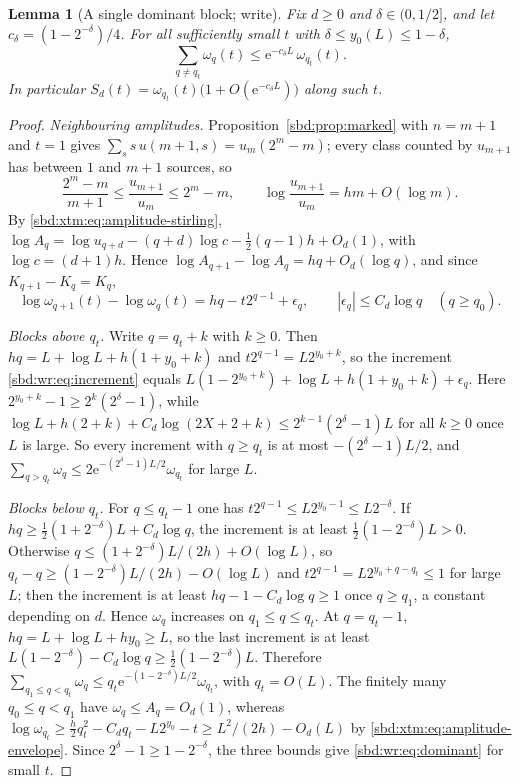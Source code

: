 \documentclass[11pt,a4paper]{article}
\newtheorem{lemma}[theorem]{Lemma}
\theoremstyle{definition}
\newcommand{\e}{\mathrm e}
\begin{document}
\begin{lemma}[A single dominant block; write]\label{sbd:wr:lem:dominant}
Fix $d\ge0$ and $\delta\in(0,1/2]$, and let $c_\delta=(1-2^{-\delta})/4$.
For all sufficiently small $t$ with $\delta\le y_0(L)\le1-\delta$,
\begin{equation}\label{sbd:wr:eq:dominant}
 \sum_{q\ne q_t}\omega_q(t)\le\e^{-c_\delta L}\,\omega_{q_t}(t).
\end{equation}
In particular $S_d(t)=\omega_{q_t}(t)\bigl(1+O(\e^{-c_\delta L})\bigr)$ along
such $t$.
\end{lemma}
\begin{proof}
\emph{Neighbouring amplitudes.} Proposition~\ref{sbd:prop:marked} with
$n=m+1$ and $t=1$ gives $\sum_ss\,u(m+1,s)=u_m(2^m-m)$; every class counted
by $u_{m+1}$ has between $1$ and $m+1$ sources, so
\begin{equation}\label{sbd:wr:eq:core-ratio}
 \frac{2^m-m}{m+1}\le\frac{u_{m+1}}{u_m}\le2^m-m,\qquad
 \log\frac{u_{m+1}}{u_m}=hm+O(\log m).
\end{equation}
By \eqref{sbd:xtm:eq:amplitude-stirling},
$\log A_q=\log u_{q+d}-(q+d)\log c-\tfrac12(q-1)h+O_d(1)$, with
$\log c=(d+1)h$. Hence $\log A_{q+1}-\log A_q=hq+O_d(\log q)$, and since
$K_{q+1}-K_q=K_q$,
\begin{equation}\label{sbd:wr:eq:increment}
 \log\omega_{q+1}(t)-\log\omega_q(t)=hq-t2^{q-1}+\epsilon_q,\qquad
 |\epsilon_q|\le C_d\log q\quad(q\ge q_0).
\end{equation}

\emph{Blocks above $q_t$.} Write $q=q_t+k$ with $k\ge0$. Then
$hq=L+\log L+h(1+y_0+k)$ and $t2^{q-1}=L2^{y_0+k}$, so the increment
\eqref{sbd:wr:eq:increment} equals
$L(1-2^{y_0+k})+\log L+h(1+y_0+k)+\epsilon_q$. Here
$2^{y_0+k}-1\ge2^k(2^\delta-1)$, while
$\log L+h(2+k)+C_d\log(2X+2+k)\le2^{k-1}(2^\delta-1)L$ for all $k\ge0$ once
$L$ is large. So every increment with $q\ge q_t$ is at most
$-(2^\delta-1)L/2$, and
$\sum_{q>q_t}\omega_q\le2\e^{-(2^\delta-1)L/2}\omega_{q_t}$ for large $L$.

\emph{Blocks below $q_t$.} For $q\le q_t-1$ one has
$t2^{q-1}\le L2^{y_0-1}\le L2^{-\delta}$. If $hq\ge
\tfrac12(1+2^{-\delta})L+C_d\log q$, the increment is at least
$\tfrac12(1-2^{-\delta})L>0$. Otherwise $q\le(1+2^{-\delta})L/(2h)+O(\log
L)$, so $q_t-q\ge(1-2^{-\delta})L/(2h)-O(\log L)$ and
$t2^{q-1}=L2^{y_0+q-q_t}\le1$ for large $L$; then the increment is at least
$hq-1-C_d\log q\ge1$ once $q\ge q_1$, a constant depending on $d$. Hence
$\omega_q$ increases on $q_1\le q\le q_t$. At $q=q_t-1$,
$hq=L+\log L+hy_0\ge L$, so the last increment is at least
$L(1-2^{-\delta})-C_d\log q\ge\tfrac12(1-2^{-\delta})L$. Therefore
$\sum_{q_1\le q<q_t}\omega_q\le q_t\e^{-(1-2^{-\delta})L/2}\omega_{q_t}$,
with $q_t=O(L)$. The finitely many $q_0\le q<q_1$ have
$\omega_q\le A_q=O_d(1)$, whereas $\log\omega_{q_t}\ge\tfrac h2q_t^2-C_dq_t-
L2^{y_0}-t\ge L^2/(2h)-O_d(L)$ by \eqref{sbd:xtm:eq:amplitude-envelope}.
Since $2^\delta-1\ge1-2^{-\delta}$, the three bounds give
\eqref{sbd:wr:eq:dominant} for small $t$.
\end{proof}
\end{document}
